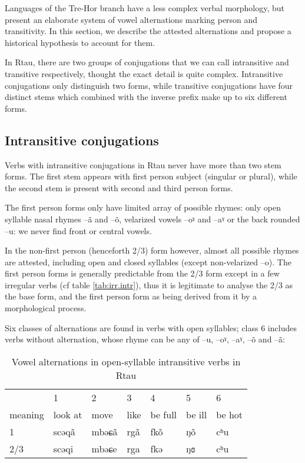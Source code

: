 \documentclass[oneside,a4paper,11pt]{article}
\newcommand{\ipa}[1]{{\phon #1}} %
\begin{document}
Languages of the Tre-Hor branch   have a less complex verbal morphology, but present an elaborate system of vowel alternations marking person and transitivity. In this section, we describe the attested alternations and propose a historical hypothesis to account for them.

In Rtau, there are two groups of conjugations that we can call intransitive and transitive respectively, thought the exact detail is quite complex. Intransitive conjugations only distinguish two forms, while transitive conjugations have four distinct stems which combined with the inverse prefix make up to six different forms.

\subsection{Intransitive conjugations}
Verbs with intransitive conjugations in Rtau never have more than two stem forms. The first stem appears with first person subject (singular or plural), while the second stem is present with second and third person forms.

The first person forms only have limited array of possible rhymes: only open syllable nasal rhymes --\ipa{ã} and --\ipa{õ}, velarized vowels --\ipa{oˠ} and --\ipa{aˠ} or the back rounded --\ipa{u}: we never find front or central vowels.

In the non-first person  (henceforth 2/3)  form however, almost all possible rhymes are attested, including open and closed syllables (except non-velarized --\ipa{o}). The first person forms is generally predictable from the 2/3 form except in a few irregular verbs (cf table \ref{tab:irr.intr}), thus it is legitimate to analyse the 2/3 as the base form, and the first person form as being derived from it by a morphological process.
 
 
Six classes of alternations are found in verbs with open syllables; class 6 includes verbs without alternation, whose rhyme can be any of --\ipa{u}, --\ipa{oˠ}, --\ipa{aˠ}, --\ipa{õ} and --\ipa{ã}:
\begin{table}[H]
\caption{Vowel alternations in open-syllable intransitive verbs in Rtau} \label{tab:open.intr} \centering
\begin{tabular}{llll|ll|l}
\toprule
&1&2&3&4&5&6 \\
meaning &	look at   &  	move   &  	like&  	be full     &  	 	be ill      &  	be hot       \\  
\midrule
1&	\ipa{scəqã} & 	\ipa{mbəɕã} & \ipa{rgã} &	\ipa{fkõ} & 	  	\ipa{ŋõ} & 	   	\ipa{cʰu}   \\ 
2/3&	\ipa{scəqi} & 	\ipa{mbəɕe} & \ipa{rga} & 	\ipa{fkə} & 	  	\ipa{ŋɞ} & 	 	\ipa{cʰu}  \\ 
\bottomrule
\end{tabular}
\end{table}
\end{document}
